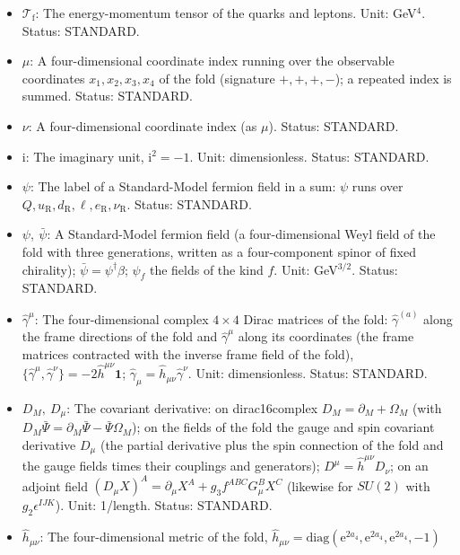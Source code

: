 \documentclass[
  10pt,
]{article}
\providecommand{\tightlist}{%
  \setlength{\itemsep}{0pt}\setlength{\parskip}{0pt}}
\begin{document}
\begin{itemize}
\tightlist
\item
  \(\mathcal{T}_{\mathrm{f}}\): The energy-momentum tensor of the quarks
  and leptons. Unit: GeV\(^4\). Status: STANDARD.
\item
  \(\mu\): A four-dimensional coordinate index running over the
  observable coordinates \(x_1, x_2, x_3, x_4\) of the fold (signature
  \(+,+,+,-\)); a repeated index is summed. Status: STANDARD.
\item
  \(\nu\): A four-dimensional coordinate index (as \(\mu\)). Status:
  STANDARD.
\item
  \(\mathrm{i}\): The imaginary unit, \(\mathrm{i}^2 = -1\). Unit:
  dimensionless. Status: STANDARD.
\item
  \(\psi\): The label of a Standard-Model fermion field in a sum:
  \(\psi\) runs over
  \(Q, u_{\mathrm{R}}, d_{\mathrm{R}}, \ell, e_{\mathrm{R}}, \nu_{\mathrm{R}}\).
  Status: STANDARD.
\item
  \(\psi,\ \bar\psi\): A Standard-Model fermion field (a
  four-dimensional Weyl field of the fold with three generations,
  written as a four-component spinor of fixed chirality);
  \(\bar\psi = \psi^\dagger\beta\); \(\psi_f\) the fields of the kind
  \(f\). Unit: GeV\(^{3/2}\). Status: STANDARD.
\item
  \(\hat\gamma^\mu\): The four-dimensional complex \(4 \times 4\) Dirac
  matrices of the fold: \(\hat\gamma^{(a)}\) along the frame directions
  of the fold and \(\hat\gamma^\mu\) along its coordinates (the frame
  matrices contracted with the inverse frame field of the fold),
  \(\{\hat\gamma^\mu, \hat\gamma^\nu\} = -2\hat h^{\mu\nu}\mathbf{1}\);
  \(\hat\gamma_\mu = \hat h_{\mu\nu}\hat\gamma^\nu\). Unit:
  dimensionless. Status: STANDARD.
\item
  \(D_M,\ D_\mu\): The covariant derivative: on dirac16complex
  \(D_M = \partial_M + \Omega_M\) (with
  \(D_M\bar\Psi = \partial_M\bar\Psi - \bar\Psi\Omega_M\)); on the
  fields of the fold the gauge and spin covariant derivative \(D_\mu\)
  (the partial derivative plus the spin connection of the fold and the
  gauge fields times their couplings and generators);
  \(D^\mu = \hat h^{\mu\nu}D_\nu\); on an adjoint field
  \((D_\mu X)^A = \partial_\mu X^A + g_3f^{ABC}G^B_\mu X^C\) (likewise
  for \(SU(2)\) with \(g_2\epsilon^{IJK}\)). Unit: 1/length. Status:
  STANDARD.
\item
  \(\hat h_{\mu\nu}\): The four-dimensional metric of the fold,
  \(\hat h_{\mu\nu} = \mathrm{diag}(\mathrm{e}^{2a_4}, \mathrm{e}^{2a_4}, \mathrm{e}^{2a_4}, -1)\)

\end{itemize}
\end{document}
